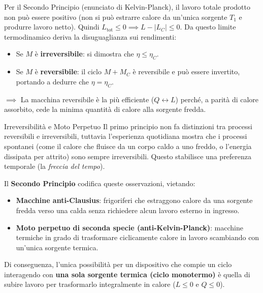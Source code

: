 Per il Secondo Principio (enunciato di Kelvin-Planck), il lavoro totale prodotto non può essere positivo (non si può estrarre calore da un'unica sorgente $T_1$ e produrre lavoro netto). Quindi $L_{\text{tot}} \le 0 \implies L - |L_C| \le 0$. Da questo limite termodinamico deriva la disuguaglianza sui rendimenti:
\begin{itemize}
    \item Se $M$ è \textbf{irreversibile}: si dimostra che $\eta \le \eta_C$.
    \item Se $M$ è \textbf{reversibile}: il ciclo $M + M_C$ è reversibile e può essere invertito, portando a dedurre che $\eta = \eta_C$.
\end{itemize}

\noindent $\implies$ La macchina reversibile è la più efficiente ($Q \leftrightarrow L$) perché, a parità di calore assorbito, cede la minima quantità di calore alla sorgente fredda.

\begin{osservazione}{Irreversibilità e Moto Perpetuo}
Il primo principio non fa distinzioni tra processi reversibili e irreversibili, tuttavia l'esperienza quotidiana mostra che i processi spontanei (come il calore che fluisce da un corpo caldo a uno freddo, o l'energia dissipata per attrito) sono sempre irreversibili. Questo stabilisce una preferenza temporale (la \textit{freccia del tempo}).

Il \textbf{Secondo Principio} codifica queste osservazioni, vietando:
\begin{itemize}
    \item \textbf{Macchine anti-Clausius}: frigoriferi che estraggono calore da una sorgente fredda verso una calda senza richiedere alcun lavoro esterno in ingresso.
    \item \textbf{Moto perpetuo di seconda specie (anti-Kelvin-Planck)}: macchine termiche in grado di trasformare ciclicamente calore in lavoro scambiando con un'unica sorgente termica.
\end{itemize}
Di conseguenza, l'unica possibilità per un dispositivo che compie un ciclo interagendo con \textbf{una sola sorgente termica (ciclo monotermo)} è quella di subire lavoro per trasformarlo integralmente in calore ($L \le 0$ e $Q \le 0$).
\end{osservazione}

